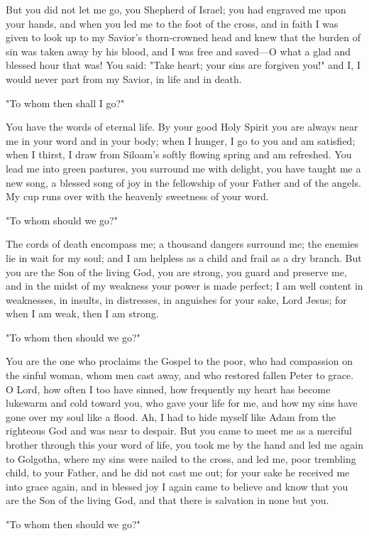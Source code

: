 But you did not let me go, you Shepherd of Israel; you had engraved me upon your hands, and when you led me to the foot of the cross, and in faith I was given to look up to my Savior’s thorn-crowned head and knew that the burden of sin was taken away by his blood, and I was free and saved—O what a glad and blessed hour that was! You said: "Take heart; your sins are forgiven you!" and I, I would never part from my Savior, in life and in death.

"To whom then shall I go?"

You have the words of eternal life. By your good Holy Spirit you are always near me in your word and in your body; when I hunger, I go to you and am satisfied; when I thirst, I draw from Siloam’s softly flowing spring and am refreshed. You lead me into green pastures, you surround me with delight, you have taught me a new song, a blessed song of joy in the fellowship of your Father and of the angels. My cup runs over with the heavenly sweetness of your word.

"To whom should we go?"

The cords of death encompass me; a thousand dangers surround me; the enemies lie in wait for my soul; and I am helpless as a child and frail as a dry branch. But you are the Son of the living God, you are strong, you guard and preserve me, and in the midst of my weakness your power is made perfect; I am well content in weaknesses, in insults, in distresses, in anguishes for your sake, Lord Jesus; for when I am weak, then I am strong.

"To whom then should we go?"

You are the one who proclaims the Gospel to the poor, who had compassion on the sinful woman, whom men cast away, and who restored fallen Peter to grace. O Lord, how often I too have sinned, how frequently my heart has become lukewarm and cold toward you, who gave your life for me, and how my sins have gone over my soul like a flood. Ah, I had to hide myself like Adam from the righteous God and was near to despair. But you came to meet me as a merciful brother through this your word of life, you took me by the hand and led me again to Golgotha, where my sins were nailed to the cross, and led me, poor trembling child, to your Father, and he did not cast me out; for your sake he received me into grace again, and in blessed joy I again came to believe and know that you are the Son of the living God, and that there is salvation in none but you.

"To whom then should we go?"

